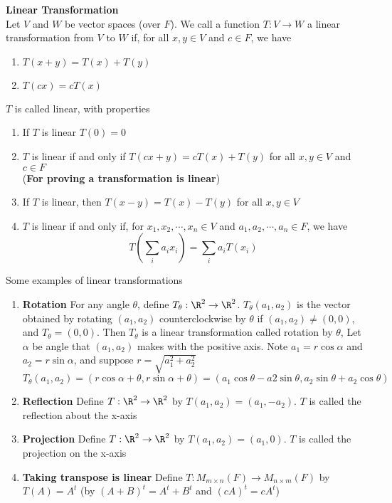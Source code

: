 \documentclass[11pt]{article}
\begin{document}
\begin{defn*}
    \textbf{Linear Transformation} \\
    Let $V$ and $W$ be vector spaces (over $F$). We call a function $T:V\to W$ a linear transformation from $V$ to $W$ if, for all $x,y\in V$ and $c\in F$, we have
    \begin{enumerate}
        \item $T(x+y)=T(x)+T(y)$
        \item $T(cx) = cT(x)$
    \end{enumerate}
    $T$ is called linear, with properties 
    \begin{enumerate}
        \item If $T$ is linear $T(0)=0$
        \item $T$ is linear if and only if $T(cx+y)=cT(x)+T(y)$ for all $x,y\in V$ and $c\in F$ \\ (\textbf{For proving a transformation is linear})
        \item If $T$ is linear, then $T(x-y)=T(x)-T(y)$ for all $x,y\in V$
        \item $T$ is linear if and only if, for $x_1,x_2,\cdots, x_n\in V$ and $a_1,a_2,\cdots, a_n\in F$, we have
        \[
            T(\sum_i a_i x_i) = \sum_i a_i T(x_i)  
        \]
    \end{enumerate}
    Some examples of linear transformations 
    \begin{enumerate}
        \item \textbf{Rotation} For any angle $\theta$, define $T_{\theta}:\R^2\to\R^2$. $T_{\theta}(a_1,a_2)$ is the vector obtained by rotating $(a_1,a_2)$ counterclockwise by $\theta$ if $(a_1,a_2)\neq (0,0)$, and $T_{\theta}=(0,0)$. Then $T_{\theta}$ is a linear transformation called rotation by $\theta$, Let $\alpha$ be angle that $(a_1,a_2)$ makes with the positive axis. Note $a_1 = r\cos{\alpha}$ and $a_2 = r\sin{\alpha}$, and suppose $r = \sqrt{a_1^2+a_2^2}$
        \[
            T_{\theta}(a_1,a_2) = (r\cos{\alpha+\theta}, r\sin{\alpha+\theta}) = (a_1\cos{\theta} - a2\sin{\theta}, a_2\sin{\theta} + a_2\cos{\theta})
        \]
        \item \textbf{Reflection} Define $T:\R^2\to \R^2$ by $T(a_1,a_2) = (a_1,-a_2)$. $T$ is called the reflection about the x-axis 
        \item \textbf{Projection} Define $T:\R^2\to\R^2$ by $T(a_1,a_2)=(a_1,0)$. $T$ is called the projection on the x-axis
        \item \textbf{Taking transpose is linear} Define $T:M_{m\times n}(F)\to M_{n\times m}(F)$ by $T(A)=A^t$ (by $(A+B)^t =  A^t + B^t$ and $(cA)^t = cA^t$)

\end{enumerate}
\end{defn*}
\end{document}
